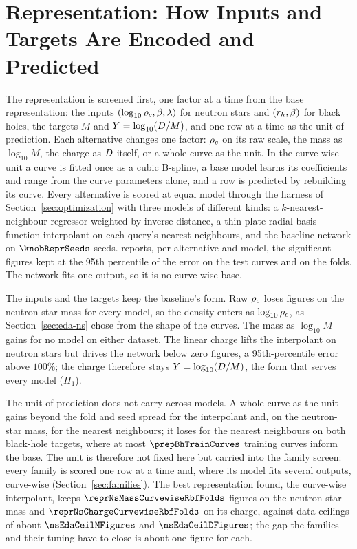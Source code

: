 \section{Representation: How Inputs and Targets Are Encoded and Predicted}
\label{sec:representation}

The representation is screened first, one factor at a time from the base representation: the inputs $(\log_{10}\rho_c, \beta, \lambda)$ for neutron stars and $(r_h, \beta)$ for black holes, the targets $M$ and $Y = \log_{10}(D/M)$, and one row at a time as the unit of prediction. Each alternative changes one factor: $\rho_c$ on its raw scale, the mass as $\log_{10} M$, the charge as $D$ itself, or a whole curve as the unit. In the curve-wise unit a curve is fitted once as a cubic B-spline, a base model learns its coefficients and range from the curve parameters alone, and a row is predicted by rebuilding its curve. Every alternative is scored at equal model through the harness of Section~\ref{sec:optimization} with three models of different kinds: a $k$-nearest-neighbour regressor weighted by inverse distance, a thin-plate radial basis function interpolant on each query's nearest neighbours, and the baseline network on $\knobReprSeeds$ seeds.  reports, per alternative and model, the significant figures kept at the 95th percentile of the error on the test curves and on the folds. The network fits one output, so it is no curve-wise base.


The inputs and the targets keep the baseline's form. Raw $\rho_c$ loses figures on the neutron-star mass for every model, so the density enters as $\log_{10}\rho_c$, as Section~\ref{sec:eda-ns} chose from the shape of the curves. The mass as $\log_{10} M$ gains for no model on either dataset. The linear charge lifts the interpolant on neutron stars but drives the network below zero figures, a 95th-percentile error above $100\%$; the charge therefore stays $Y = \log_{10}(D/M)$, the form that serves every model ($H_1$).

The unit of prediction does not carry across models. A whole curve as the unit gains beyond the fold and seed spread for the interpolant and, on the neutron-star mass, for the nearest neighbours; it loses for the nearest neighbours on both black-hole targets, where at most $\prepBhTrainCurves$ training curves inform the base. The unit is therefore not fixed here but carried into the family screen: every family is scored one row at a time and, where its model fits several outputs, curve-wise (Section~\ref{sec:families}). The best representation found, the curve-wise interpolant, keeps $\reprNsMassCurvewiseRbfFolds$ figures on the neutron-star mass and $\reprNsChargeCurvewiseRbfFolds$ on its charge, against data ceilings of about $\nsEdaCeilMFigures$ and $\nsEdaCeilDFigures$; the gap the families and their tuning have to close is about one figure for each.
